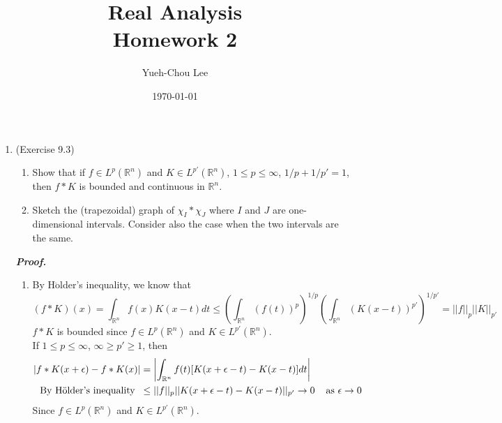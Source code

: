 \documentclass[a4paper,11pt]{article}
\title{Real Analysis \\ Homework 2}
\author{Yueh-Chou Lee}
\date{\today}
\begin{document}
\maketitle
\begin{enumerate}


	\item (Exercise 9.3)
		\begin{enumerate}

			\item Show that if $f \in L^p (\mathbb{R}^n)$ and $K \in L^{p'} (\mathbb{R}^n)$, $1 \leq p \leq \infty$, $1/p + 1/p' = 1$, then $f \ast K$ is bounded and continuous in $\mathbb{R}^n$.

			\item Sketch the (trapezoidal) graph of $\chi_I \ast \chi_J$ where $I$ and $J$ are one-dimensional intervals. Consider also the case when the two intervals are the same.

		\end{enumerate}
	\textit{\textbf {Proof.}}\\
		\begin{enumerate}

			\item
				By H$\ddot{\text{o}}$lder's inequality, we know that
					$$(f \ast K)(x) = \int_{\mathbb{R}^n} f(x) K(x-t) dt
					\leq \left( \int_{\mathbb{R}^n} \left( f(t) \right)^p \right)^{1/p} \left( \int_{\mathbb{R}^n} \left( K(x-t) \right)^{p'} \right)^{1/p'}
					= ||f||_p ||K||_{p'}$$
				$f \ast K$ is bounded since $f \in L^p (\mathbb{R}^n)$ and $K \in L^{p'} (\mathbb{R}^n)$.\\

				If $1 \leq p \leq \infty$, $\infty \geq p' \geq 1$, then
					$$\begin{aligned}
					\left| f \ast K(x + \epsilon) - f \ast K (x) \right|
					&= \left| \int_{\mathbb{R}^n} f(t) [K(x+\epsilon-t) - K(x-t)] dt \right|\\
					\text{By H$\ddot{\text{o}}$lder's inequality} \hspace{0.2cm}
					&\leq ||f||_p || K(x+\epsilon-t) - K(x-t) ||_{p'}
					\to 0
					\hspace{0.4cm} \text{as $\epsilon \to 0$}
					\end{aligned}$$
				Since $f \in L^p (\mathbb{R}^n)$ and $K \in L^{p'} (\mathbb{R}^n)$.\\


\end{enumerate}
\end{enumerate}
\end{document}
